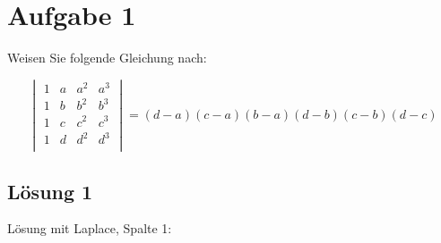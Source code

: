 \documentclass[main.tex]{subfiles}
\begin{document}
\section{Aufgabe 1}
Weisen Sie folgende Gleichung nach:

$$
    \begin{vmatrix}
        1 & a & a^2 & a^3 \\
        1 & b & b^2 & b^3 \\
        1 & c & c^2 & c^3 \\
        1 & d & d^2 & d^3 \\
    \end{vmatrix}
    = (d-a)(c-a)(b-a)(d-b)(c-b)(d-c)
$$

\subsection{Lösung 1}
Lösung mit Laplace, Spalte 1:
\end{document}
